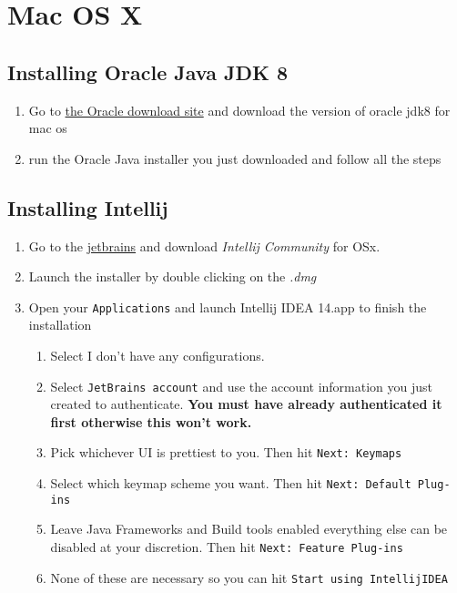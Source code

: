 \documentclass{article}
\begin{document}
\section{Mac OS X}

	\subsection{Installing Oracle Java JDK 8}
		\begin{enumerate}
			\item Go to \href{http://www.oracle.com/technetwork/java/javase/downloads/jdk8-downloads-2133151.html} {the
			Oracle download site} and download the version of oracle jdk8 for mac os
			\item run the Oracle Java installer you just downloaded and follow all the steps
		\end{enumerate}


	\subsection{Installing Intellij}

		\begin{enumerate}
			\item Go to the \href{https://www.jetbrains.com/idea/download/index.html} {jetbrains} and download
			\textit{Intellij Community} for OSx.
			\item Launch the installer by double clicking on the \textit{.dmg}
			\item Open your \texttt{Applications} and launch Intellij IDEA 14.app to finish the installation
			\begin{enumerate}
				\item Select I don't have any configurations.
				\item Select \texttt{JetBrains account} and use the account information you just created to
				authenticate. \textbf{You must have already authenticated it first otherwise this won't work.}
				\item Pick whichever UI is prettiest to you. Then hit \texttt{Next: Keymaps}
				\item Select which keymap scheme you want. Then hit \texttt{Next: Default Plug-ins}
				\item Leave Java Frameworks and Build tools enabled everything else can be disabled at your discretion.
				Then hit \texttt{Next: Feature Plug-ins}
				\item None of these are necessary so you can hit \texttt{Start using IntellijIDEA}
			\end{enumerate}
		\end{enumerate}
\end{document}
